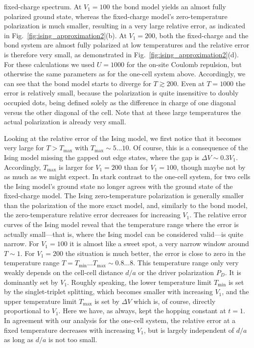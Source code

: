 fixed-charge spectrum. At $V_1 = 100$ the bond model yields an almost fully
polarized ground state, whereas the fixed-charge model's zero-temperature
polarization is much smaller, resulting in a very large relative error, as
indicated in Fig.~\ref{fig:ising_approximation2}(b). At $V_1 = 200$, both the
fixed-charge and the bond system are almost fully polarized at low temperatures
and the relative error is therefore very small, as demonstrated in
Fig.~\ref{fig:ising_approximation2}(d). For these calculations we used $U=1000$
for the on-site Coulomb repulsion, but otherwise the same parameters as for the
one-cell system above. Accordingly, we can see that the bond model starts to
diverge for $T \gtrsim 200$. Even at $T=1000$ the error is relatively small,
because the polarization is quite insensitive to doubly occupied dots, being
defined solely as the difference in charge of one diagonal versus the other
diagonal of the cell. Note that at these large temperatures the actual
polarization is already very small.

Looking at the relative error of the Ising model, we first notice that it
becomes very large for $T > T_{\textrm{max}}$ with $T_{\textrm{max}} \sim 5
\ldots 10$. Of course, this is a consequence of the Ising model missing the
gapped out edge states, where the gap is $\Delta V \sim 0.3 V_1$. Accordingly,
$T_{\textrm{max}}$ is larger for $V_1 = 200$ than for $V_1 = 100$, though maybe
not by as much as we might expect. In stark contrast to the one-cell system, for
two cells the Ising model's ground state no longer agrees with the ground state
of the fixed-charge model. The Ising zero-temperature polarization is generally
smaller than the polarization of the more exact model, and, similarly to the
bond model, the zero-temperature relative error decreases for increasing $V_1$.
The relative error curves of the Ising model reveal that the temperature range
where the error is actually small---that is, where the Ising model can be
considered valid---is quite narrow. For $V_1 = 100$ it is almost like a sweet
spot, a very narrow window around $T \sim 1$. For $V_1 = 200$ the situation is
much better, the error is close to zero in the temperature range $T =
T_{\textrm{min}} \ldots T_{\textrm{max}} \sim 0.8 \ldots 8$. This temperature
range only very weakly depends on the cell-cell distance $d/a$ or the driver
polarization $P_D$. It is dominantly set by $V_1$. Roughly speaking, the lower
temperature limit $T_{\textrm{min}}$ is set by the singlet-triplet splitting,
which becomes smaller with increasing $V_1$, and the upper temperature limit
$T_{\textrm{max}}$ is set by $\Delta V$ which is, of course, directly
proportional to $V_1$. Here we have, as always, kept the hopping constant at
$t=1$. In agreement with our analysis for the one-cell system, the relative
error at a fixed temperature decreases with increasing $V_1$, but is largely
independent of $d/a$ as long as $d/a$ is not too small.

